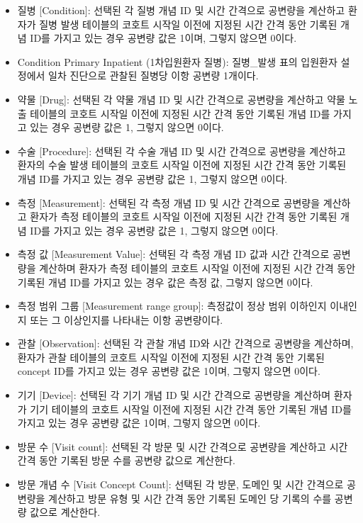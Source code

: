 \documentclass[11pt]{book}
\providecommand{\tightlist}{%
  \setlength{\itemsep}{0pt}\setlength{\parskip}{0pt}}
\theoremstyle{definition}
\theoremstyle{definition}
\theoremstyle{definition}
\theoremstyle{remark}
\begin{document}
\begin{itemize}
\tightlist
\item
  질병 {[}Condition{]}: 선택된 각 질병 개념 ID 및 시간 간격으로 공변량을
  계산하고 환자가 질병 발생 테이블의 코호트 시작일 이전에 지정된 시간
  간격 동안 기록된 개념 ID를 가지고 있는 경우 공변량 값은 1이며, 그렇지
  않으면 0이다.
\item
  Condition Primary Inpatient (1차입원환자 질병): 질병\_발생 표의
  입원환자 설정에서 일차 진단으로 관찰된 질병당 이항 공변량 1개이다.
\item
  약물 {[}Drug{]}: 선택된 각 약물 개념 ID 및 시간 간격으로 공변량을
  계산하고 약물 노출 테이블의 코호트 시작일 이전에 지정된 시간 간격 동안
  기록된 개념 ID를 가지고 있는 경우 공변량 값은 1, 그렇지 않으면 0이다.
\item
  수술 {[}Procedure{]}: 선택된 각 수술 개념 ID 및 시간 간격으로 공변량을
  계산하고 환자의 수술 발생 테이블의 코호트 시작일 이전에 지정된 시간
  간격 동안 기록된 개념 ID를 가지고 있는 경우 공변량 값은 1, 그렇지
  않으면 0이다.
\item
  측정 {[}Measurement{]}: 선택된 각 측정 개념 ID 및 시간 간격으로
  공변량을 계산하고 환자가 측정 테이블의 코호트 시작일 이전에 지정된
  시간 간격 동안 기록된 개념 ID를 가지고 있는 경우 공변량 값은 1, 그렇지
  않으면 0이다.
\item
  측정 값 {[}Measurement Value{]}: 선택된 각 측정 개념 ID 값과 시간
  간격으로 공변량을 계산하며 환자가 측정 테이블의 코호트 시작일 이전에
  지정된 시간 간격 동안 기록된 개념 ID를 가지고 있는 경우 값은 측정 값,
  그렇지 않으면 0이다.
\item
  측정 범위 그룹 {[}Measurement range group{]}: 측정값이 정상 범위
  이하인지 이내인지 또는 그 이상인지를 나타내는 이항 공변량이다.
\item
  관찰 {[}Observation{]}: 선택된 각 관찰 개념 ID와 시간 간격으로
  공변량을 계산하며, 환자가 관찰 테이블의 코호트 시작일 이전에 지정된
  시간 간격 동안 기록된 concept ID를 가지고 있는 경우 공변량 값은 1이며,
  그렇지 않으면 0이다.
\item
  기기 {[}Device{]}: 선택된 각 기기 개념 ID 및 시간 간격으로 공변량을
  계산하며 환자가 기기 테이블의 코호트 시작일 이전에 지정된 시간 간격
  동안 기록된 개념 ID를 가지고 있는 경우 공변량 값은 1이며, 그렇지
  않으면 0이다.
\item
  방문 수 {[}Visit count{]}: 선택된 각 방문 및 시간 간격으로 공변량을
  계산하고 시간 간격 동안 기록된 방문 수를 공변량 값으로 계산한다.
\item
  방문 개념 수 {[}Visit Concept Count{]}: 선택된 각 방문, 도메인 및 시간
  간격으로 공변량을 계산하고 방문 유형 및 시간 간격 동안 기록된 도메인
  당 기록의 수를 공변량 값으로 계산한다.
\end{itemize}
\end{document}
